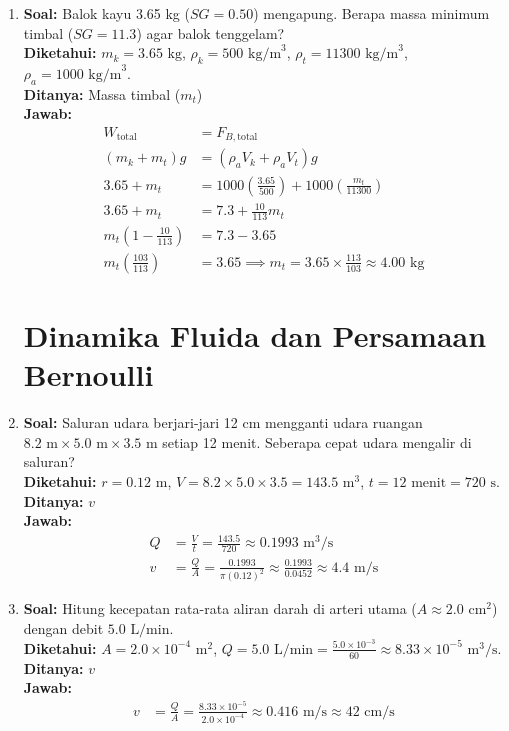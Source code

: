 \documentclass[twocolumn]{article}
\begin{document}
\begin{enumerate}
    \item \textbf{Soal:} Balok kayu 3.65 kg ($SG = 0.50$) mengapung. Berapa massa minimum timbal ($SG = 11.3$) agar balok tenggelam? \\
    \textbf{Diketahui:} $m_k = 3.65 \text{ kg}$, $\rho_k = 500 \text{ kg/m}^3$, $\rho_t = 11300 \text{ kg/m}^3$, $\rho_a = 1000 \text{ kg/m}^3$. \\
    \textbf{Ditanya:} Massa timbal ($m_t$) \\
    \textbf{Jawab:}
    \begin{align*}
        W_{\text{total}} &= F_{B,\text{total}} \\
        (m_k + m_t)g &= (\rho_a V_k + \rho_a V_t)g \\
        3.65 + m_t &= 1000 \left( \frac{3.65}{500} \right) + 1000 \left( \frac{m_t}{11300} \right) \\
        3.65 + m_t &= 7.3 + \frac{10}{113}m_t \\
        m_t \left( 1 - \frac{10}{113} \right) &= 7.3 - 3.65 \\
        m_t \left( \frac{103}{113} \right) &= 3.65 \implies m_t = 3.65 \times \frac{113}{103} \approx 4.00 \text{ kg}
    \end{align*}

    \section*{Dinamika Fluida dan Persamaan Bernoulli}

    \item \textbf{Soal:} Saluran udara berjari-jari 12 cm mengganti udara ruangan $8.2 \text{ m} \times 5.0 \text{ m} \times 3.5 \text{ m}$ setiap 12 menit. Seberapa cepat udara mengalir di saluran? \\
    \textbf{Diketahui:} $r = 0.12 \text{ m}$, $V = 8.2 \times 5.0 \times 3.5 = 143.5 \text{ m}^3$, $t = 12 \text{ menit} = 720 \text{ s}$. \\
    \textbf{Ditanya:} $v$ \\
    \textbf{Jawab:}
    \begin{align*}
        Q &= \frac{V}{t} = \frac{143.5}{720} \approx 0.1993 \text{ m}^3/\text{s} \\
        v &= \frac{Q}{A} = \frac{0.1993}{\pi (0.12)^2} \approx \frac{0.1993}{0.0452} \approx 4.4 \text{ m/s}
    \end{align*}

    \item \textbf{Soal:} Hitung kecepatan rata-rata aliran darah di arteri utama ($A \approx 2.0 \text{ cm}^2$) dengan debit $5.0 \text{ L/min}$. \\
    \textbf{Diketahui:} $A = 2.0 \times 10^{-4} \text{ m}^2$, $Q = 5.0 \text{ L/min} = \frac{5.0 \times 10^{-3}}{60} \approx 8.33 \times 10^{-5} \text{ m}^3/\text{s}$. \\
    \textbf{Ditanya:} $v$ \\
    \textbf{Jawab:}
    \begin{align*}
        v &= \frac{Q}{A} = \frac{8.33 \times 10^{-5}}{2.0 \times 10^{-4}} \approx 0.416 \text{ m/s} \approx 42 \text{ cm/s}
    \end{align*}


\end{enumerate}
\end{document}
